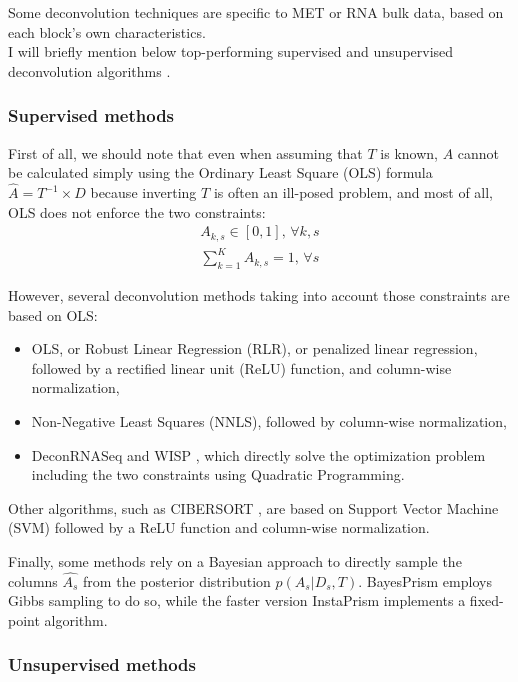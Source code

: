 \documentclass{article}
\begin{document}
Some deconvolution techniques are specific to MET or RNA bulk data, based on each block's own characteristics. \\

I will briefly mention below top-performing supervised and unsupervised deconvolution algorithms \cite{avila_2020_benchmarking, titus_2017_review}.

\subsubsection{Supervised methods}\label{subsubsec:supervised-methods}

First of all, we should note that even when assuming that $T$ is known, $A$ cannot be calculated simply using the Ordinary Least Square (OLS) formula $\widehat{A} = T^{-1} \times D$ because inverting $T$ is often an ill-posed problem, and most of all, OLS does not enforce the two constraints: 
\begin{align}
A_{k,s} \in [0, 1] \text{, } \forall k,s \\
\sum_{k=1}^K A_{k,s} = 1 \text{, } \forall s
\end{align}

However, several deconvolution methods taking into account those constraints are based on OLS:
\begin{itemize}
    \item OLS, or Robust Linear Regression (RLR), or penalized linear regression, followed by a rectified linear unit (ReLU) function, and column-wise normalization,
    \item Non-Negative Least Squares (NNLS), followed by column-wise normalization,
    \item DeconRNASeq \cite{DeconRNASeq} and WISP \cite{WISP}, which directly solve the optimization problem including the two constraints using Quadratic Programming.
\end{itemize}

Other algorithms, such as CIBERSORT \cite{CIBERSORT}, are based on Support Vector Machine (SVM) followed by a ReLU function and column-wise normalization.

Finally, some methods rely on a Bayesian approach to directly sample the columns $\widehat{A_{s}}$ from the posterior distribution $p(A_{s} | D_{s}, T)$.
BayesPrism \cite{BayesPrism} employs Gibbs sampling to do so, while the faster version InstaPrism \cite{InstaPrism} implements a fixed-point algorithm.

\subsubsection{Unsupervised methods}\label{subsubsec:unsupervised-methods}
\end{document}

